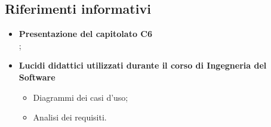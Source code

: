 \documentclass[AnalisiDeiRequisiti.tex]{subfiles}
\begin{document}
\subsection{Riferimenti informativi}
\begin{itemize}
	\item \textbf{Presentazione del capitolato C6}\\ ;
	\item \textbf{Lucidi didattici utilizzati durante il corso di Ingegneria del Software}\\ 
	\begin{itemize}
		\item Diagrammi dei casi d'uso;
		\item Analisi dei requisiti.
	\end{itemize}
\end{itemize}
\end{document}
